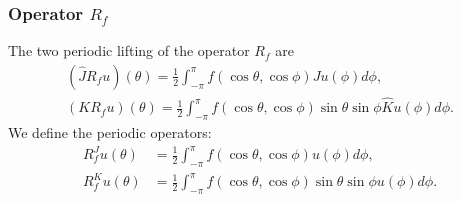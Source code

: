 \documentclass{article}
\begin{document}
\subsubsection{Operator $R_f$}
The two periodic lifting of the operator $R_f$ are 
\begin{align*}
(\widehat{J}R_f u)(\theta) = \frac{1}{2}\int_{-\pi}^{\pi} f(\cos \theta, \cos \phi) Ju(\phi) d \phi,\\
(K R_f u)(\theta) = \frac{1}{2}\int_{-\pi}^{\pi} f(\cos \theta, \cos \phi) \sin \theta \sin \phi  \widehat{K}u(\phi) d \phi.
\end{align*}
We define the periodic operators:
\begin{align*}
R_f^J u(\theta)  &= \frac{1}{2}\int_{-\pi}^{\pi} f(\cos \theta, \cos \phi) u(\phi) d \phi, \\
R_f^K u (\theta) &= \frac{1}{2}\int_{-\pi}^{\pi} f(\cos \theta, \cos \phi) \sin \theta \sin \phi  u(\phi) d \phi.
\end{align*}
\end{document}

